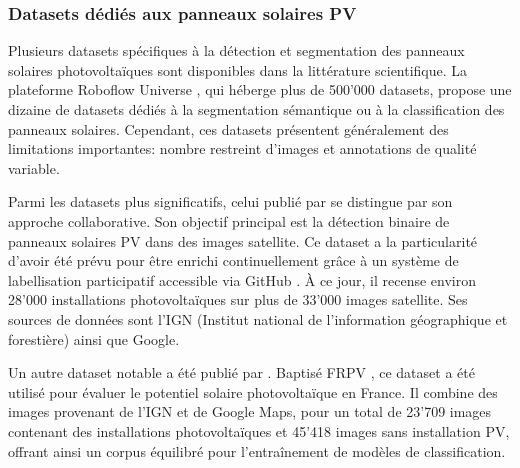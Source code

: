 \subsubsection{Datasets dédiés aux panneaux solaires PV}
\par{Plusieurs datasets spécifiques à la détection et segmentation des panneaux solaires photovoltaïques sont disponibles dans la littérature scientifique. La plateforme Roboflow Universe \cite{roboflow_roboflow_nodate}, qui héberge plus de 500'000 datasets, propose une dizaine de datasets dédiés à la segmentation sémantique ou à la classification des panneaux solaires. Cependant, ces datasets présentent généralement des limitations importantes: nombre restreint d'images et annotations de qualité variable.}
\par{Parmi les datasets plus significatifs, celui publié par \citeauthor{kasmi_crowdsourced_2023} \cite{kasmi_crowdsourced_2023, kasmi_crowdsourced_2022} se distingue par son approche collaborative. Son objectif principal est la détection binaire de panneaux solaires PV dans des images satellite. Ce dataset a la particularité d'avoir été prévu pour être enrichi continuellement grâce à un système de labellisation participatif accessible via GitHub \cite{gabrielkasmi_gabrielkasmibdappv_2025}. À ce jour, il recense environ 28'000 installations photovoltaïques sur plus de 33'000 images satellite. Ses sources de données sont l'IGN (Institut national de l'information géographique et forestière) ainsi que Google.}
\par{Un autre dataset notable a été publié par \citeauthor{thebault_comprehensive_2025} \cite{thebault_comprehensive_2025}. Baptisé FRPV \cite{thebault_frpv_2025}, ce dataset a été utilisé pour évaluer le potentiel solaire photovoltaïque en France. Il combine des images provenant de l'IGN et de Google Maps, pour un total de 23'709 images contenant des installations photovoltaïques et 45'418 images sans installation PV, offrant ainsi un corpus équilibré pour l'entraînement de modèles de classification.}


